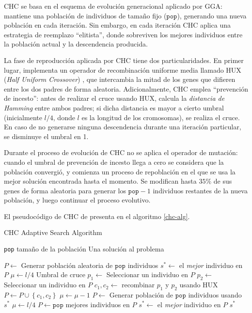 CHC \cite{eshelman1990chc} se basa en el esquema de evolución generacional aplicado por GGA: mantiene una población de individuos de tamaño fijo ($\texttt{pop}$), generando una nueva población en cada iteración. Sin embargo, en cada iteración CHC aplica una estrategia de reemplazo ``elitista'', donde sobreviven los mejores individuos entre la población actual y la descendencia producida.

La fase de reproducción aplicada por CHC tiene dos particularidades. En primer lugar, implementa un operador de recombinación uniforme media llamado HUX (\emph{Half Uniform Crossover}) \cite{eshelman1990chc}, que intercambia la mitad de los genes que difieren entre los dos padres de forma aleatoria. Adicionalmente, CHC emplea ``prevención de incesto'': antes de realizar el cruce usando HUX, calcula la \emph{distancia de Hamming} entre ambos padres; si dicha distancia es mayor a cierto umbral (inicialmente $l/4$, donde $l$ es la longitud de los cromosomas), se realiza el cruce. En caso de no generarse ninguna descendencia durante una iteración particular, se disminuye el umbral en 1.

Durante el proceso de evolución de CHC no se aplica el operador de mutación: cuando el umbral de prevención de incesto llega a cero se considera que la población convergió, y comienza un proceso de repoblación en el que se usa la mejor solución encontrada hasta el momento. Se modifican hasta $35\%$ de sus genes de forma aleatoria para generar los $\texttt{pop}-1$ individuos restantes de la nueva población, y luego continuar el proceso evolutivo.

El pseudocódigo de CHC de presenta en el algoritmo \ref{chc-alg}.

\begin{algorithm}
\caption{CHC Adaptive Search Algorithm}
\label{chc-alg}
\begin{algorithmic}[1]

\Require \texttt{pop} tamaño de la población
\Ensure Una solución al problema

\State $P \gets$ Generar población aleatoria de $\texttt{pop}$ individuos
\State $s^* \gets $ el \emph{mejor} individuo en $P$
\State $\mu \gets l/4$ \Comment Umbral de cruce
		\State $p_1 \gets$ Seleccionar un individuo en $P$
		\State $p_2 \gets$ Seleccionar un individuo en $P$
			\State $c_1, c_2 \gets $ recombinar $p_1$ y $p_2$ usando HUX
			\State $P \gets P \cup \left\lbrace c_1, c_2 \right\rbrace$
		\EndIf
	\EndFor
		\State $\mu \gets \mu-1$
			\State $P \gets$ Generar población de $\texttt{pop}$ individuos usando $s^*$
			\State $\mu \gets l/4$
		\EndIf
	\Else
		\State $P \gets \texttt{pop}$ mejores individuos en $P$
			\State $s^* \gets$ el \emph{mejor} individuo en $P$
		\EndIf
	\EndIf
\EndWhile
\State \Return $s^*$

\end{algorithmic}
\end{algorithm}

